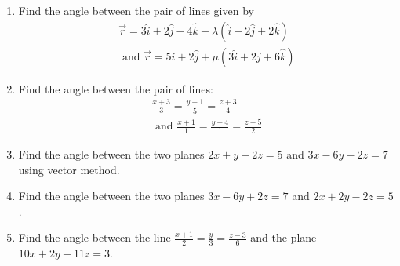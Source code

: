 \begin{enumerate}[label=\thesubsection.\arabic*, ref=\thesubsection.\theenumi]
\begin{enumerate}
\end{enumerate}
\item Find the angle between the pair of lines given by
\begin{align}
\overrightarrow{r}= 3 \hat{i}+ 2 \hat{j}- 4 \hat{k}+ \lambda(\hat{i}+ 2 \hat{j}+ 2 \hat{k}) \\
\text{ and } \overrightarrow{r}= 5 \hat{i}+ 2 \hat{j}+ \mu(3 \hat{i}+ 2 \hat{j}+ 6 \hat{k}) 
\end{align}
\item Find the angle between the pair of lines:
\begin{align}
\frac{x+3}{3}= \frac{y-1}{5}= \frac{z+3}{4}\\
\text{ and }\frac{x+1}{1}= \frac{y-4}{1}= \frac{z+5}{2}
\end{align}
\item Find the angle between the two planes $2x +y -2z =5$ and $3x- 6y- 2z= 7$ using vector method.
\item Find the angle between the two planes $3x -6y +2z =7$ and $2x +2y -2z =5$.
\item Find the angle between the line $\frac{x+1}{2} =\frac{y}{3} =\frac{z-3}{6}$ and the plane $10x +2y -11z =3$.


\end{enumerate}
